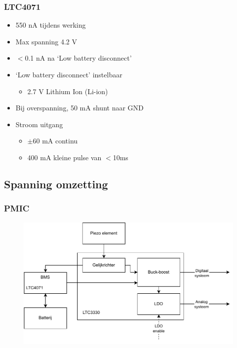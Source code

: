     \begin{frame}
        \frametitle{LTC4071}
        \begin{itemize}
            \item 550 nA tijdens werking
            \item Max spanning 4.2 V
            \item $<$0.1 nA na `Low battery disconnect'
            \item `Low battery disconnect' instelbaar
                \begin{itemize}
                    \item 2.7 V Lithium Ion (Li-ion)
                \end{itemize}
            \item Bij overspanning, 50 mA shunt naar GND
            \item Stroom uitgang
                \begin{itemize}
                    \item $\pm 60$ mA continu 
                    \item 400 mA kleine pulse van $<$10ms
                \end{itemize}
        \end{itemize}

    \end{frame}

    \subsection{Spanning omzetting}

    \begin{frame}
        \frametitle{PMIC}
        \begin{figure}[h]
            \centering
            \includegraphics[scale=0.6]{img/energie_systeem.pdf}
        \end{figure}
    \end{frame}
    
